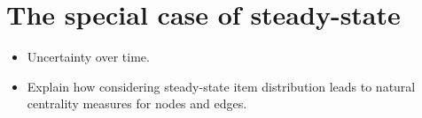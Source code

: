 \section{The special case of steady-state}
\label{sec:infinity}

\begin{itemize}
	\item Uncertainty over time.
	\item Explain how considering steady-state item distribution
		leads to natural centrality measures for nodes and edges.
\end{itemize}